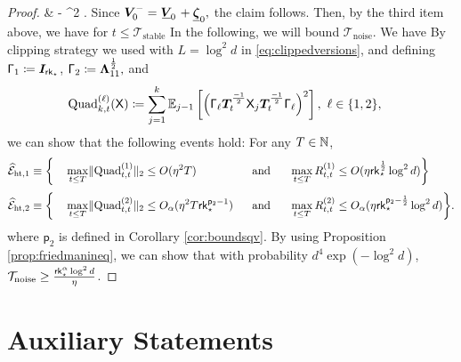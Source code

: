 \begin{proof}
{& \succeq  {} -         \Llstop^{2} .  
}
Since  $\boldsymbol{V}_{0}^{-} = \mspace{2.2mu}\underline{\mspace{-2.2mu}\boldsymbol{V}\mspace{-2.2mu}}_{0} \mspace{2.2mu} + \underline{\boldsymbol{\zeta}}_{0},$ the claim follows. Then,  by the third item above,  we have  for $t \leq \mathcal{T}_{\text{stable}}$
In the following, we will bound   $ \mathcal{T}_{\text{noise}}$. We have
By clipping strategy we used with $L = \log^2 d$ in  \eqref{eq:clippedversions}, and defining $\mathsf{\Gamma}_1 \coloneqq \boldsymbol{I}_{\mathsf{rk}_{\star}}$,  $\mathsf{\Gamma}_2   \coloneqq \boldsymbol{\Lambda}_{11}^{\frac{1}{2}}, $ and
\begin{align} 
& \text{Quad}_{k,t}^{(\ell)}( \mathsf{X}) \coloneqq     \sum_{j = 1}^k  \mathbb{E}_{j - 1} \left[ \Big( \mathsf{\Gamma}_{\ell}  \boldsymbol{T}_t^{\frac{-1}{2}} \mathsf{X}_{j}  \boldsymbol{T}_t^{\frac{-1}{2}}  \mathsf{\Gamma}_\ell \Big)^2 \right], ~ \ell \in \{1,2\},
\end{align}
we can show that the following events hold: For any $T \in \mathbb{N}$,
\begin{alignat}{4}
& \widehat{\mathcal{E}}_{\mathrm{ht},1} \equiv \bigg \lbrace &&\max_{t \leq T}  \lVert \text{Quad}^{(1)}_{t,t}\rVert_2 \leq O(\eta^2 T) ~~&& \text{and} ~~   
&&\max_{t \leq T}  R_{t,t}^{(1)}   \leq  O(\eta \mathsf{rk}_{\star}^{\frac{1}{2}} \log^2 d)  \bigg \rbrace     \\[0.25em]
&  \widehat{\mathcal{E}}_{\mathrm{ht},2} \equiv \bigg \lbrace && \max_{t \leq T}  \lVert \text{Quad}^{(2)}_{t,t}\rVert_2 \leq O_{\alpha}(\eta^2 T \mathsf{rk}_{\star}^{\mathsf{p}_2 -1} )~~&& \text{and} ~~ 
&& \max_{t \leq T}  R_{t,t}^{(2)}    \leq   O_{\alpha}(\eta \mathsf{rk}_{\star}^{\mathsf{p}_2 -\frac{1}{2}} \log^2 d )  \bigg \rbrace   . 
\end{alignat}
where $\mathsf{p}_2$  is defined in Corollary \ref{cor:boundsqv}. By using Proposition \ref{prop:friedmanineq}, we can show that with probability $d^4 \exp(- \log^2 d)$,   $\mathcal{T}_{\text{noise}} \geq \frac{\mathsf{rk}_{\star}^{\alpha} \log^2 d}{\eta}$.
\end{proof} 


 
\section{Auxiliary Statements}
\label{sec:auxstats}
